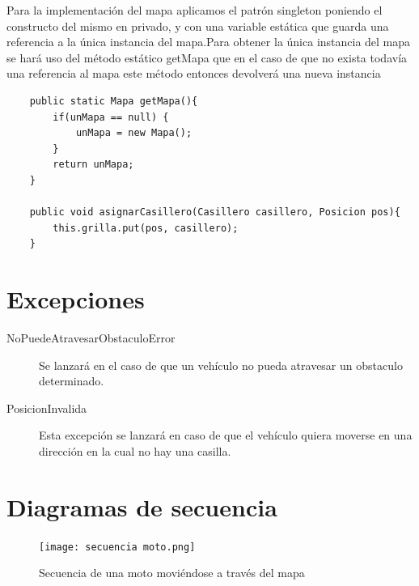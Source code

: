 \documentclass[titlepage,a4paper]{article}
\begin{document}
    Para la implementación del mapa aplicamos el patrón singleton poniendo el constructo del mismo en privado, y con una variable estática que guarda una referencia a la única instancia del mapa.Para obtener la única instancia del mapa se hará uso del método estático getMapa que en el caso de que no exista todavía una referencia al mapa este método entonces devolverá una nueva instancia

    \begin{lstlisting}
    public static Mapa getMapa(){
        if(unMapa == null) {
            unMapa = new Mapa();
        }
        return unMapa;
    }

	public void asignarCasillero(Casillero casillero, Posicion pos){
        this.grilla.put(pos, casillero);
    }
    \end{lstlisting}


    \section{Excepciones}\label{sec:excepciones}

    \begin{description}
        \item[NoPuedeAtravesarObstaculoError] Se lanzará en el caso de que un vehículo no pueda atravesar un obstaculo determinado.
        \item[PosicionInvalida] Esta excepción se lanzará en caso de que el vehículo quiera moverse en una dirección en la cual no hay una casilla.

    \end{description}

    \section{Diagramas de secuencia}\label{sec:diagramasdesecuencia}



    \begin{figure}[H]
        \centering
        \texttt{[image: secuencia moto.png]}
        \caption{\label{fig:seq01}Secuencia de una moto moviéndose a través del mapa}
    \end{figure}
\end{document}
